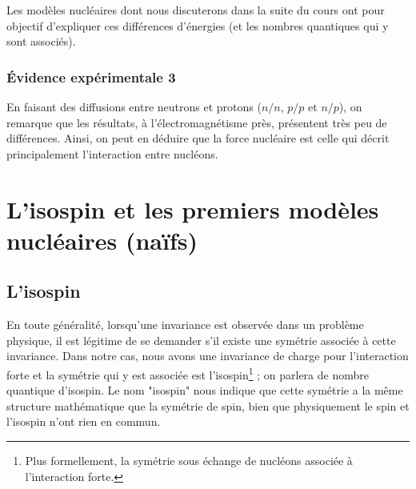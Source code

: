 Les modèles nucléaires dont nous discuterons dans la suite du cours ont pour objectif d'expliquer ces différences d'énergies (et les nombres quantiques qui y sont associés).


\subsubsection{Évidence expérimentale 3}


En faisant des diffusions entre neutrons et protons ($n/n$, $p/p$ et $n/p$), on remarque que les résultats, à l'électromagnétisme près, présentent très peu de différences. Ainsi, on peut en déduire que la force nucléaire est celle qui décrit principalement l'interaction entre nucléons.









\section{L'isospin et les premiers modèles nucléaires (naïfs)}

\subsection{L'isospin}

En toute généralité, lorsqu'une invariance est observée dans un problème physique, il est légitime de se demander s'il existe une symétrie associée à cette invariance. Dans notre cas, nous avons une invariance de charge pour l'interaction forte et la symétrie qui y est associée est l'isospin\footnote{Plus formellement, la symétrie sous échange de nucléons associée à l'interaction forte.} ; on parlera de nombre quantique d'isospin. Le nom "isospin" nous indique que cette symétrie a la même structure mathématique que la symétrie de spin, bien que physiquement le spin et l'isospin n'ont rien en commun.\\

